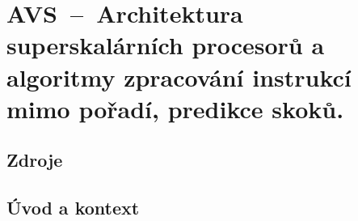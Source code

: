 

\graphicspath{{avs/architektura_superskalarnich_procesoru/figures}}


\chapter{AVS~--~Architektura superskalárních procesorů a algoritmy zpracování instrukcí mimo pořadí, predikce skoků.}


\section{Zdroje}

\begin{compactitem}
    \item {}
    \item {}
    \item {}
    \item {}
    \item {}
    \item {}
    \item {}
    \item {}
\end{compactitem}


\section{Úvod a kontext}

